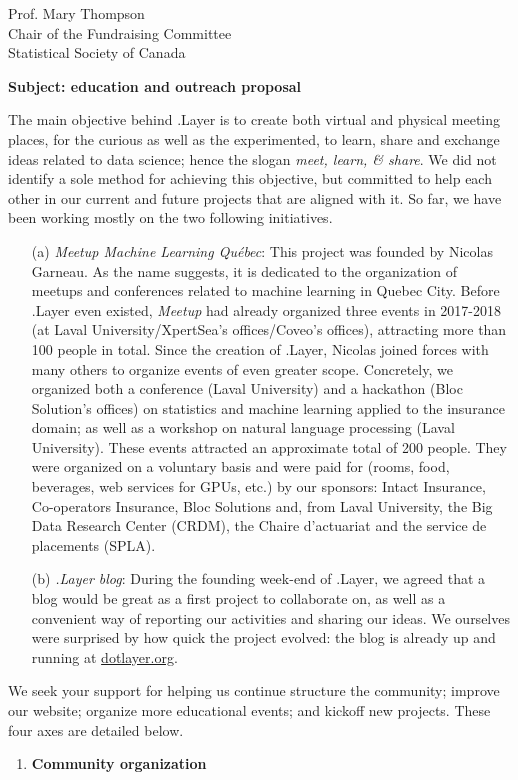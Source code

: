 \documentclass[11pt, a4paper]{letter} %
\begin{document}
\begin{letter}{
	Prof. Mary Thompson\\
	Chair of the Fundraising Committee\\
	Statistical Society of Canada
	
	\bigskip
	\textbf{Subject: education and outreach proposal}%
}
The main objective behind .Layer is to create both virtual and physical meeting places, for the curious as well as the experimented, to learn, share and exchange ideas related to data science; hence the slogan \emph{meet, learn, \& share}. We did not identify a sole method for achieving this objective, but committed to help each other in our current and future projects that are aligned with it. So far, we have been working mostly on the two following initiatives.
\begin{enumerate}
	\item[(a)] \emph{Meetup Machine Learning Québec}: This project was founded by Nicolas Garneau. As the name suggests, it is dedicated to the organization of meetups and conferences related to machine learning in Quebec City. Before .Layer even existed, \emph{Meetup} had already organized three events in 2017-2018 (at Laval University/XpertSea's offices/Coveo's offices), attracting more than 100 people in total. Since the creation of .Layer, Nicolas joined forces with many others to organize events of even greater scope. Concretely, we organized both a conference (Laval University) and a hackathon (Bloc Solution's offices) on statistics and machine learning applied to the insurance domain; as well as a workshop on natural language processing (Laval University). These events attracted an approximate total of 200 people. They were organized on a voluntary basis and were paid for (rooms, food, beverages, web services for GPUs, etc.) by our sponsors: Intact Insurance, Co-operators Insurance, Bloc Solutions and, from Laval University, the Big Data Research Center (CRDM), the Chaire d'actuariat and the service de placements (SPLA).
	\item[(b)] \emph{.Layer blog}: During the founding week-end of .Layer, we agreed that a blog would be great as a first project to collaborate on, as well as a convenient way of reporting our activities and sharing our ideas. We ourselves were surprised by how quick the project evolved: the blog is already up and running at \href{https://www.dotlayer.org/}{dotlayer.org}.
\end{enumerate}

We seek your support for helping us continue structure the community; improve our website; organize more educational events; and kickoff new projects. These four axes are detailed below.

\begin{enumerate}
	\item \textbf{Community organization}
	

\end{enumerate}
\end{letter}
\end{document}
